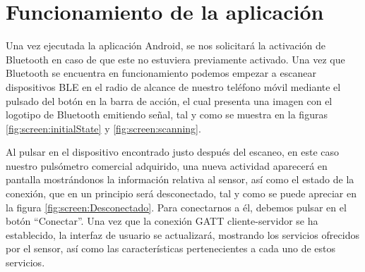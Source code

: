 \label{chp:App}
\section{Funcionamiento de la aplicación}
    
    Una vez ejecutada la aplicación Android, se nos solicitará la activación de Bluetooth en caso de que este no estuviera previamente activado. Una vez que Bluetooth se encuentra en funcionamiento podemos empezar a escanear dispositivos BLE en el radio de alcance de nuestro teléfono móvil mediante el pulsado del botón en la barra de acción, el cual presenta una imagen con el logotipo de Bluetooth emitiendo señal, tal y como se muestra en la figuras \ref{fig:screen:initialState} y \ref{fig:screen:scanning}.
    
    Al pulsar en el dispositivo encontrado justo después del escaneo, en este caso nuestro pulsómetro comercial adquirido, una nueva actividad aparecerá en pantalla mostrándonos la información relativa al sensor, así como el estado de la conexión, que en un principio será desconectado, tal y como se puede apreciar en la figura  \ref{fig:screen:Desconectado}.  Para conectarnos a él, debemos pulsar en el botón ``Conectar''. Una vez que la conexión GATT cliente-servidor se ha establecido, la interfaz de usuario se actualizará, mostrando los servicios ofrecidos por el sensor, así como las características pertenecientes a cada uno de estos servicios.
    
    \vfill
    
